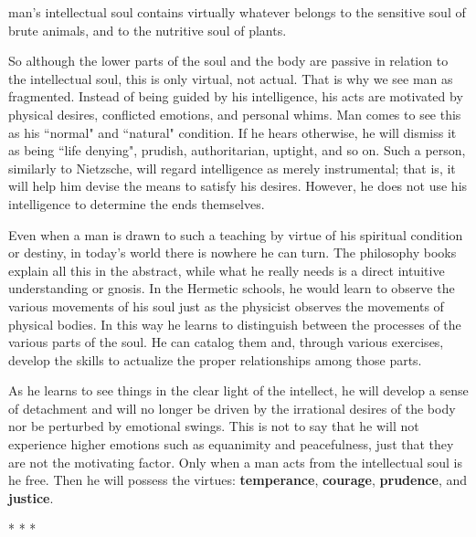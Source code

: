 \begin{quotex}
man's intellectual soul contains virtually whatever belongs to the sensitive soul of brute animals, and to the nutritive soul of plants. 

\end{quotex}
So although the lower parts of the soul and the body are passive in relation to the intellectual soul, this is only virtual, not actual. That is why we see man as fragmented. Instead of being guided by his intelligence, his acts are motivated by physical desires, conflicted emotions, and personal whims. Man comes to see this as his ``normal" and ``natural" condition. If he hears otherwise, he will dismiss it as being ``life denying", prudish, authoritarian, uptight, and so on. Such a person, similarly to Nietzsche, will regard intelligence as merely instrumental; that is, it will help him devise the means to satisfy his desires. However, he does not use his intelligence to determine the ends themselves.

Even when a man is drawn to such a teaching by virtue of his spiritual condition or destiny, in today's world there is nowhere he can turn. The philosophy books explain all this in the abstract, while what he really needs is a direct intuitive understanding or gnosis. In the Hermetic schools, he would learn to observe the various movements of his soul just as the physicist observes the movements of physical bodies. In this way he learns to distinguish between the processes of the various parts of the soul. He can catalog them and, through various exercises, develop the skills to actualize the proper relationships among those parts.

As he learns to see things in the clear light of the intellect, he will develop a sense of detachment and will no longer be driven by the irrational desires of the body nor be perturbed by emotional swings. This is not to say that he will not experience higher emotions such as equanimity and peacefulness, just that they are not the motivating factor. Only when a man acts from the intellectual soul is he free. Then he will possess the virtues: \textbf{temperance}, \textbf{courage}, \textbf{prudence}, and \textbf{justice}.




\begin{center}* * *\end{center}

